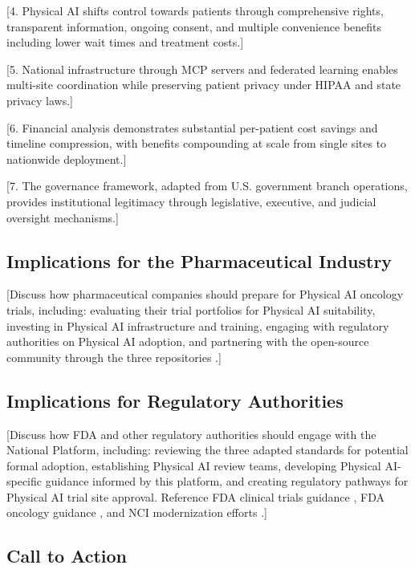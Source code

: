 [4. Physical AI shifts control towards patients through comprehensive
rights, transparent information, ongoing consent, and multiple convenience
benefits including lower wait times and treatment costs.]

[5. National infrastructure through MCP servers and federated learning
enables multi-site coordination while preserving patient privacy under
HIPAA and state privacy laws.]

[6. Financial analysis demonstrates substantial per-patient cost savings
and timeline compression, with benefits compounding at scale from single
sites to nationwide deployment.]

[7. The governance framework, adapted from U.S. government branch operations,
provides institutional legitimacy through legislative, executive, and judicial
oversight mechanisms.]

\subsection{Implications for the Pharmaceutical Industry}
\label{subsec:conclusion-pharma}

[Discuss how pharmaceutical companies should prepare for Physical AI
oncology trials, including: evaluating their trial portfolios for Physical AI
suitability, investing in Physical AI infrastructure and training,
engaging with regulatory authorities on Physical AI adoption, and
partnering with the open-source community through the three repositories
\cite{main-repo, mcp-repo, fl-repo}.]

\subsection{Implications for Regulatory Authorities}
\label{subsec:conclusion-regulatory}

[Discuss how FDA and other regulatory authorities should engage with the
National Platform, including: reviewing the three adapted standards for
potential formal adoption, establishing Physical AI review teams,
developing Physical AI-specific guidance informed by this platform, and
creating regulatory pathways for Physical AI trial site approval. Reference
FDA clinical trials guidance \cite{fda-clinical-trials-guidance}, FDA oncology
guidance \cite{fda-oncology-guidance}, and NCI modernization efforts
\cite{nci-modernizing}.]

\subsection{Call to Action}
\label{subsec:conclusion-action}

